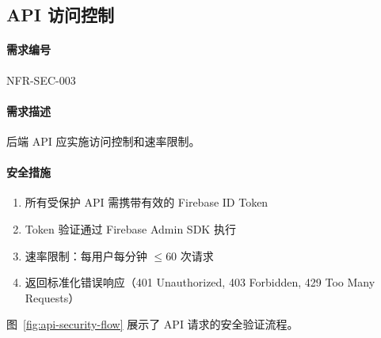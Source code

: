 \subsection{API 访问控制}

\paragraph{需求编号} NFR-SEC-003

\paragraph{需求描述} 后端 API 应实施访问控制和速率限制。

\paragraph{安全措施}
\begin{enumerate}
    \item 所有受保护 API 需携带有效的 Firebase ID Token
    \item Token 验证通过 Firebase Admin SDK 执行
    \item 速率限制：每用户每分钟 $\leq 60$ 次请求
    \item 返回标准化错误响应（401 Unauthorized, 403 Forbidden, 429 Too Many Requests）
\end{enumerate}

图~\ref{fig:api-security-flow} 展示了 API 请求的安全验证流程。

